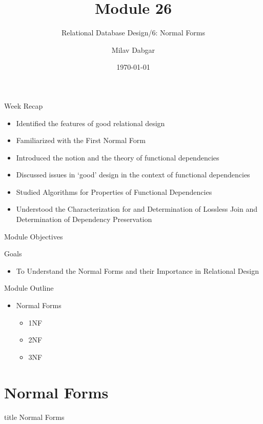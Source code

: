 \documentclass[aspectratio=169, xcolor=dvipsnames]{beamer}
\title{Module 26}
\subtitle{Relational Database Design/6: Normal Forms}
\author{Milav Dabgar}
\institute{www.milav.in}
\date{\today}
\begin{document}
\begin{frame}
    \titlepage
\end{frame}

\begin{frame}{Week Recap}
    \begin{itemize}[<+->]
        \item Identified the features of good relational design
        \item Familiarized with the First Normal Form
        \item Introduced the notion and the theory of functional dependencies
        \item Discussed issues in `good' design in the context of functional dependencies
        \item Studied Algorithms for Properties of Functional Dependencies
        \item Understood the Characterization for and Determination of Lossless Join and Determination of Dependency Preservation
    \end{itemize}
\end{frame}

\begin{frame}{Module Objectives}
    \begin{block}{Goals}
        \begin{itemize}[<+->]
            \item To Understand the Normal Forms and their Importance in Relational Design
        \end{itemize}
    \end{block}
\end{frame}

\begin{frame}{Module Outline}
    \begin{itemize}[<+->]
        \item Normal Forms
        \begin{itemize}
            \item[$\triangleright$] 1NF
            \item[$\triangleright$] 2NF
            \item[$\triangleright$] 3NF
        \end{itemize}
    \end{itemize}
\end{frame}

\section{Normal Forms}
\begin{frame}
  \vfill
  \centering
  \begin{beamercolorbox}[sep=8pt,center,shadow=true,rounded=true]{title}
    Normal Forms\par%
  \end{beamercolorbox}
  \vfill
\end{frame}
\end{document}
